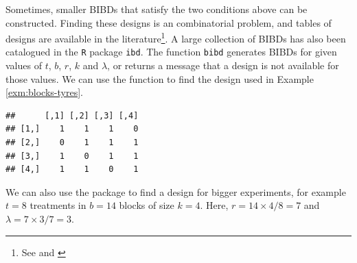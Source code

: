 \documentclass[
]{book}
\newenvironment{Shaded}{\begin{snugshade}}{\end{snugshade}}
\newcommand{\AttributeTok}[1]{\textcolor[rgb]{0.77,0.63,0.00}{#1}}
\newcommand{\CommentTok}[1]{\textcolor[rgb]{0.56,0.35,0.01}{\textit{#1}}}
\newcommand{\DecValTok}[1]{\textcolor[rgb]{0.00,0.00,0.81}{#1}}
\newcommand{\FunctionTok}[1]{\textcolor[rgb]{0.00,0.00,0.00}{#1}}
\newcommand{\NormalTok}[1]{#1}
\newcommand{\OtherTok}[1]{\textcolor[rgb]{0.56,0.35,0.01}{#1}}
\newcommand{\SpecialCharTok}[1]{\textcolor[rgb]{0.00,0.00,0.00}{#1}}
\theoremstyle{definition}
\theoremstyle{definition}
\theoremstyle{definition}
\theoremstyle{definition}
\theoremstyle{remark}
\begin{document}
Sometimes, smaller BIBDs that satisfy the two conditions above can be constructed. Finding these designs is an combinatorial problem, and tables of designs are available in the literature\footnote{See \citet{CochranCox1957} and \citet{FisherYates1963}}. A large collection of BIBDs has also been catalogued in the \texttt{R} package \texttt{ibd}. The function \texttt{bibd} generates BIBDs for given values of \(t\), \(b\), \(r\), \(k\) and \(\lambda\), or returns a message that a design is not available for those values. We can use the function to find the design used in Example \ref{exm:blocks-tyres}.

\begin{Shaded}
\end{Shaded}

\begin{verbatim}
##      [,1] [,2] [,3] [,4]
## [1,]    1    1    1    0
## [2,]    0    1    1    1
## [3,]    1    0    1    1
## [4,]    1    1    0    1
\end{verbatim}

We can also use the package to find a design for bigger experiments, for example \(t=8\) treatments in \(b=14\) blocks of size \(k=4\). Here, \(r = 14\times 4 / 8 = 7\) and \(\lambda = 7 \times 3 / 7 = 3\).

\begin{Shaded}
\end{Shaded}
\end{document}
